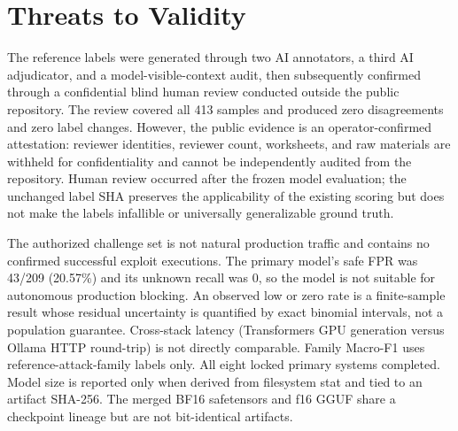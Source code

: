 \section{Threats to Validity}
The reference labels were generated through two AI annotators, a third AI adjudicator,
and a model-visible-context audit, then subsequently confirmed through a confidential
blind human review conducted outside the public repository. The review covered all 413
samples and produced zero disagreements and zero label changes. However, the public
evidence is an operator-confirmed attestation: reviewer identities, reviewer count,
worksheets, and raw materials are withheld for confidentiality and cannot be independently
audited from the repository. Human review occurred after the frozen model evaluation;
the unchanged label SHA preserves the applicability of the existing scoring but does not
make the labels infallible or universally generalizable ground truth.

The authorized challenge set is not natural production traffic and contains no confirmed
successful exploit executions. The primary model's safe FPR was 43/209 (20.57\%) and its
unknown recall was 0, so the model is not suitable for autonomous production blocking.
An observed low or zero rate is a finite-sample result whose residual uncertainty is
quantified by exact binomial intervals, not a population guarantee. Cross-stack latency
(Transformers GPU generation versus Ollama HTTP round-trip) is not directly comparable.
Family Macro-F1 uses reference-attack-family labels only. All eight locked primary systems
completed. Model size is reported only when derived from filesystem stat and tied to an
artifact SHA-256. The merged BF16 safetensors and f16 GGUF share a checkpoint lineage but
are not bit-identical artifacts.
